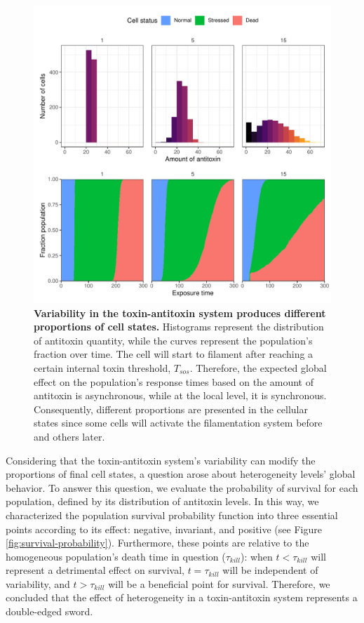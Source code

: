 \documentclass[a4paper, nobind]{templates/ociamthesis}
\begin{document}
\begin{figure}[H]
\includegraphics[width=1\linewidth]{downloadFigs4latex__main/variability-toxin-antitoxin} \caption[Variability in the toxin-antitoxin system produces different proportions of cell states.]{\textbf{Variability in the toxin-antitoxin system produces different proportions of cell states.} Histograms represent the distribution of antitoxin quantity, while the curves represent the population's fraction over time. The cell will start to filament after reaching a certain internal toxin threshold, \(T_{sos}\). Therefore, the expected global effect on the population's response times based on the amount of antitoxin is asynchronous, while at the local level, it is synchronous. Consequently, different proportions are presented in the cellular states since some cells will activate the filamentation system before and others later.}\label{fig:variability-toxin-antitoxin}
\end{figure}

Considering that the toxin-antitoxin system's variability can modify the proportions of final cell states, a question arose about heterogeneity levels' global behavior. To answer this question, we evaluate the probability of survival for each population, defined by its distribution of antitoxin levels. In this way, we characterized the population survival probability function into three essential points according to its effect: negative, invariant, and positive (see Figure \ref{fig:survival-probability}). Furthermore, these points are relative to the homogeneous population's death time in question (\(\tau_{kill}\)): when \(t < \tau_{kill}\) will represent a detrimental effect on survival, \(t = \tau_{kill}\) will be independent of variability, and \(t > \tau_{kill}\) will be a beneficial point for survival. Therefore, we concluded that the effect of heterogeneity in a toxin-antitoxin system represents a double-edged sword.
\end{document}
